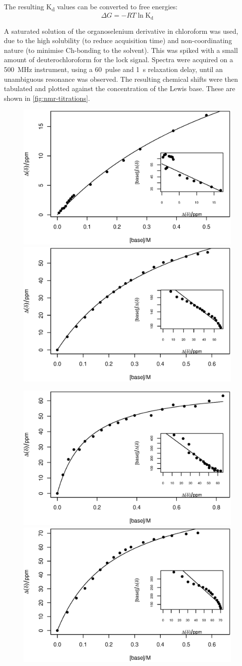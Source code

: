 \begin{refsection}
The resulting K\textsubscript{d} values can be converted to free energies:
\begin{equation}
    \Delta G = -RT \ln{\mathrm{K_d}}
\end{equation}

A saturated solution of the organoselenium derivative in chloroform was used, due to the high solubility (to reduce acquisition time) and non-coordinating nature (to minimise Ch-bonding to the solvent).
This was spiked with a small amount of deuterochloroform for the lock signal.
Spectra were acquired on a 500~MHz instrument, using a 60\degree~pulse and 1~s relaxation delay, until an unambiguous  resonance was observed.
The resulting chemical shifts were then tabulated and plotted against the concentration of the Lewis base.
These are shown in \ref{fig:nmr-titrations}.

\begin{figure}
    \centering
    \includegraphics[width=0.48\linewidth]{Figures/nmr-titration/bn-ebs-dmap.eps}
    \includegraphics[width=0.48\linewidth]{Figures/nmr-titration/4oet-ebs-dmap.eps}
    
    \includegraphics[width=0.48\linewidth]{Figures/nmr-titration/ebs-dmap.eps}
    \includegraphics[width=0.48\linewidth]{Figures/nmr-titration/4br-ebs-dmap.eps}
    

\end{figure}
\end{refsection}
